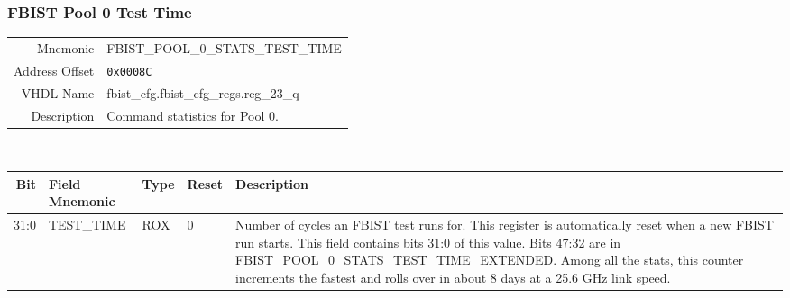 \subsubsection{FBIST Pool 0 Test Time}
\begin{tabular}{ r | p{350px} }
  Mnemonic       & FBIST\_POOL\_0\_STATS\_TEST\_TIME       \\
  Address Offset & \texttt{0x0008C}                        \\
  VHDL Name      &  fbist\_cfg.fbist\_cfg\_regs.reg\_23\_q \\ \hline

  Description &
  Command statistics for Pool 0. \\
\end{tabular}
\\
\begin{tabularx}{\textwidth}{r|l|l|l|X}
  \hline
  Bit   & Field Mnemonic & Type & Reset & Description \\ \hline

  31:0  & TEST\_TIME     & ROX  & 0     &

  Number of cycles an FBIST test runs for. This register is
  automatically reset when a new FBIST run starts. This field contains
  bits 31:0 of this value. Bits 47:32 are in
  FBIST\_POOL\_0\_STATS\_TEST\_TIME\_EXTENDED. Among all the stats,
  this counter increments the fastest and rolls over in about 8 days
  at a 25.6 GHz link speed. \\
\end{tabularx}

